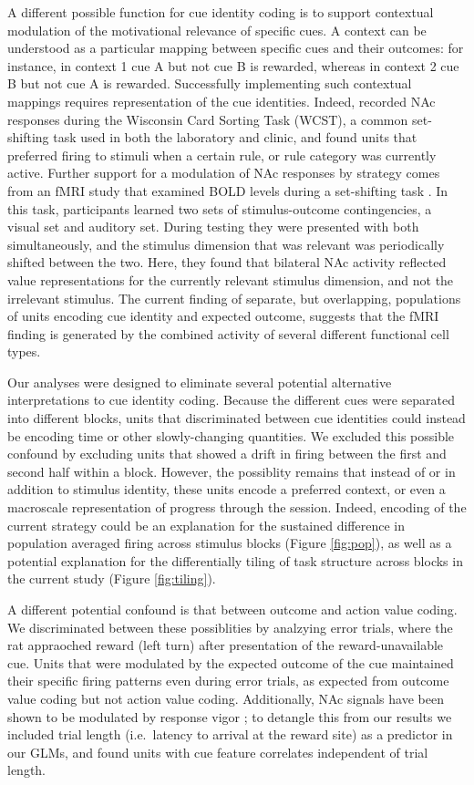 \documentclass[11pt]{article}
\let\cite=\citep
\let\citeNP=\citealt
\begin{document}
{A different possible function for cue identity coding is to support
contextual modulation of the motivational relevance of specific
cues. A context can be understood as a particular mapping between
specific cues and their outcomes: for instance, in context 1 cue A but
not cue B is rewarded, whereas in context 2 cue B but not cue A is
rewarded. Successfully implementing such contextual mappings requires
representation of the cue identities. Indeed, \citeNP{Sleezer2016}
recorded NAc responses during the Wisconsin Card Sorting Task (WCST),
a common set-shifting task used in both the laboratory and clinic, and
found units that preferred firing to stimuli when a certain rule, or
rule category was currently active. Further support for a
modulation of NAc responses by strategy comes from an fMRI study that
examined BOLD levels during a set-shifting task
\cite{Fitzgerald2014}. In this task, participants learned two sets of
stimulus-outcome contingencies, a visual set and auditory set. During
testing they were presented with both simultaneously, and the stimulus
dimension that was relevant was periodically shifted between the
two. Here, they found that bilateral NAc activity reflected value
representations for the currently relevant stimulus dimension, and not
the irrelevant stimulus. The current finding of separate, but
overlapping, populations of units encoding cue identity and expected
outcome, suggests that the fMRI finding is generated by the combined
activity of several different functional cell types.

Our analyses were designed to eliminate several potential alternative
interpretations to cue identity coding. Because the different cues
were separated into different blocks, units that discriminated between
cue identities could instead be encoding time or other slowly-changing
quantities. We excluded this possible confound by excluding units that
showed a drift in firing between the first and second half within a
block. However, the possiblity remains that instead of or in addition
to stimulus identity, these units encode a preferred context, or even
a macroscale representation of progress through the session. Indeed,
encoding of the current strategy could be an explanation for the
sustained difference in population averaged firing across stimulus
blocks (Figure \ref{fig:pop}), as well as a potential explanation for
the differentially tiling of task structure across blocks in the
current study (Figure \ref{fig:tiling}).

A different potential confound is that between outcome and action
value coding. We discriminated between these possiblities by analzying
error trials, where the rat appraoched reward (left turn) after
presentation of the reward-unavailable cue. Units that were modulated
by the expected outcome of the cue maintained their specific firing
patterns even during error trials, as expected from outcome value
coding but not action value coding. Additionally, NAc signals have
been shown to be modulated by response vigor \cite{McGinty2013}; to
detangle this from our results we included trial length (i.e.\ latency
to arrival at the reward site) as a predictor in our GLMs, and found
units with cue feature correlates independent of trial length.

}
\end{document}
